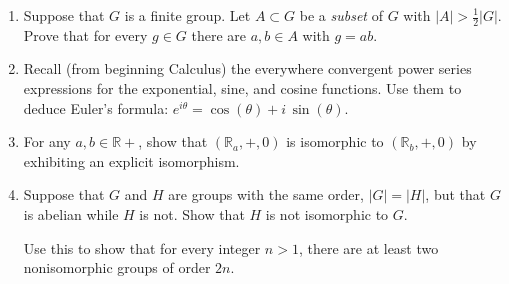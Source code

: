 \documentclass[12pt]{article}
\newcommand{\RR}{{\mathbb R}}
\begin{document}
\begin{enumerate}

\item
   Suppose that $G$ is a finite group.
   Let $A\subset G$ be a {\it subset} of $G$ with $|A|> \frac{1}{2}|G|$.
   Prove that for every $g\in G$ there are $a,b\in A$ with $g=ab$.

\item
  Recall (from beginning Calculus)  the everywhere convergent power series expressions for the exponential, sine, and
  cosine functions.
  Use them to deduce Euler's formula:  $e^{i\theta}=\cos(\theta)+ i\, \sin(\theta)$.


\item
  For any $a,b\in \RR+$, show that $(\RR_a,+,0)$ is isomorphic to $(\RR_b,+,0)$ by exhibiting an explicit isomorphism.

\item
  Suppose that $G$ and $H$ are groups with the same order, $|G|=|H|$, but that $G$ is abelian while $H$ is not.
  Show that $H$ is not isomorphic to $G$.

  Use this to show that for every integer $n>1$, there are at least two nonisomorphic groups of order $2n$.

\end{enumerate}
\end{document}
